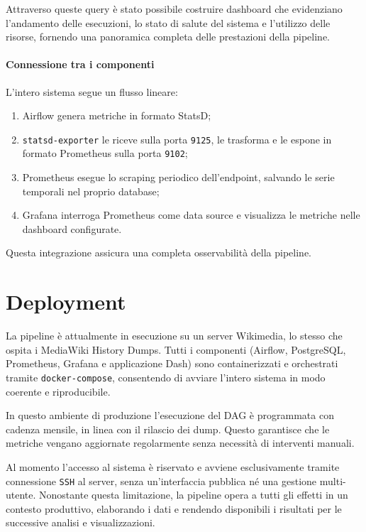 Attraverso queste query è stato possibile costruire dashboard che evidenziano l’andamento delle esecuzioni, lo stato di salute del sistema e l’utilizzo delle risorse, fornendo una panoramica completa delle prestazioni della pipeline.



\paragraph{Connessione tra i componenti}
L’intero sistema segue un flusso lineare:
\begin{enumerate}
    \item Airflow genera metriche in formato StatsD;
    \item \texttt{statsd-exporter} le riceve sulla porta \texttt{9125}, le trasforma e le espone in formato Prometheus sulla porta \texttt{9102};
    \item Prometheus esegue lo scraping periodico dell’endpoint, salvando le serie temporali nel proprio database;
    \item Grafana interroga Prometheus come data source e visualizza le metriche nelle dashboard configurate.
\end{enumerate}
Questa integrazione assicura una completa osservabilità della pipeline.

\section{Deployment}
\label{sec:impldeployment}

La pipeline è attualmente in esecuzione su un server Wikimedia, lo stesso che ospita 
i MediaWiki History Dumps. Tutti i componenti (Airflow, PostgreSQL, Prometheus, 
Grafana e applicazione Dash) sono containerizzati e orchestrati tramite 
\texttt{docker-compose}, consentendo di avviare l’intero sistema in modo coerente 
e riproducibile. 

In questo ambiente di produzione l'esecuzione del DAG  è programmata 
con cadenza mensile, in linea con il rilascio dei dump. 
Questo garantisce che le metriche vengano aggiornate regolarmente senza 
necessità di interventi manuali. 

Al momento l’accesso al sistema è riservato e avviene esclusivamente tramite 
connessione \texttt{SSH} al server, senza un’interfaccia pubblica né una gestione 
multi-utente. Nonostante questa limitazione, la pipeline opera a tutti gli effetti 
in un contesto produttivo, elaborando i dati e rendendo disponibili i 
risultati per le successive analisi e visualizzazioni.

\clearpage